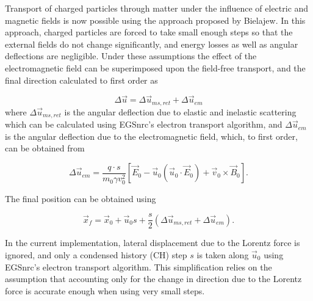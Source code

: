 Transport of charged particles through matter under the influence of electric and magnetic fields is now possible
using the approach proposed by Bielajew\cite{Bi89a}. In this approach, charged particles are forced
to take small enough steps so that the external fields do not change significantly, and energy losses as well
as angular deflections are negligible. Under these assumptions the effect of the electromagnetic field can
be superimposed upon the field-free transport, and the final direction calculated to first order as

\begin{equation}
\Delta\vec{u} = \Delta\vec{u}_{ms,ret} + \Delta\vec{u}_{em}
\end{equation}
where $\Delta\vec{u}_{ms,ret}$ is the angular deflection due to elastic and inelastic scattering which
can be calculated using EGSnrc's electron transport algorithm, and $\Delta\vec{u}_{em}$ is the angular
deflection due to the electromagnetic field, which, to first order, can be obtained from

\begin{equation}
\label{uchange_emf}
    \Delta\vec{u}_{em} = \frac{q \cdot s}{m_0 \gamma v^2_0} \left[\vec{E}_0 - \vec{u}_0(\vec{u}_0\cdot \vec{E}_0) + \vec{v}_0 \times \vec{B}_0\right].
\end{equation}

The final position can be obtained using

\begin{equation}
    \vec{x}_f = \vec{x}_0 + \vec{u}_0 s + \frac{s}{2} \left(\Delta\vec{u}_{ms,ret} + \Delta\vec{u}_{em}\right).
\end{equation}

In the current implementation, lateral displacement due to the Lorentz force is ignored,
and only a condensed history (CH) step $s$ is taken along $\vec{u}_0$ using EGSnrc's electron
transport algorithm. This simplification relies on the assumption that accounting only for
the change in direction due to the Lorentz force is accurate enough when using very small steps.


